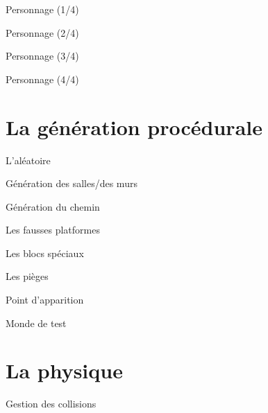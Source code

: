 \documentclass{beamer}
\begin{document}
{\begin{frame}{Personnage (1/4)}
\end{frame}

\begin{frame}{Personnage (2/4)}

\end{frame}

\begin{frame}{Personnage (3/4)}

\end{frame}

\begin{frame}{Personnage (4/4)}

\end{frame}

\section{La génération procédurale}
\begin{frame}{L'aléatoire}

\end{frame}

\begin{frame}{Génération des salles/des murs}

\end{frame}

\begin{frame}{Génération du chemin}

\end{frame}

\begin{frame}{Les fausses platformes}

\end{frame}

\begin{frame}{Les blocs spéciaux}

\end{frame}

\begin{frame}{Les pièges}

\end{frame}

\begin{frame}{Point d'apparition}

\end{frame}

\begin{frame}{Monde de test}

\end{frame}

\section{La physique}
\begin{frame}{Gestion des collisions}


\end{frame}}
\end{document}

